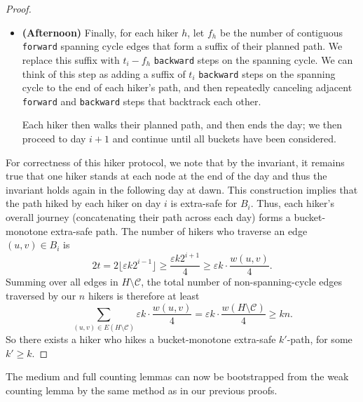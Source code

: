 \documentclass{theoretics}
\newcommand{\eps}{\varepsilon}
\newcommand{\cee}{\mathcal{C}}
\newcommand{\forward}{\texttt{forward}}
\newcommand{\backward}{\texttt{backward}}
\begin{document}
\begin{proof}
\begin{itemize}
\item \textbf{(Afternoon)} Finally, for each hiker $h$, let $f_h$ be the number of contiguous \forward{} spanning cycle edges that form a suffix of their planned path.
We replace this suffix with $t_i-f_h$ \backward{} steps on the spanning cycle.
We can think of this step as adding a suffix of $t_i$ \backward{} steps on the spanning cycle to the end of each hiker's path, and then repeatedly canceling adjacent \forward{} and \backward{} steps that backtrack each other.

Each hiker then walks their planned path, and then ends the day; we then proceed to day $i+1$ and continue until all buckets have been considered.
\end{itemize}

For correctness of this hiker protocol, we note that by the invariant, it remains true that one hiker stands at each node at the end of the day and thus the invariant holds again in the following day at dawn.
This construction implies that the path hiked by each hiker on day $i$ is extra-safe for $B_i$.
Thus, each hiker's overall journey (concatenating their path across each day) forms a bucket-monotone extra-safe path.
The number of hikers who traverse an edge $(u, v) \in B_i$ is
$$2t = 2 \lfloor \eps k 2^{i-1} \rfloor \ge \frac{\eps k 2^{i+1}}{4} \ge \eps k \cdot \frac{w(u, v)}{4}.$$
Summing over all edges in $H \setminus \cee$, the total number of non-spanning-cycle edges traversed by our $n$ hikers is therefore at least
$$\sum \limits_{(u, v) \in E(H \setminus \cee)} \eps k \cdot \frac{w(u, v)}{4} = \eps k \cdot \frac{w(H \setminus \cee)}{4} \ge kn.$$
So there exists a hiker who hikes a bucket-monotone extra-safe $k'$-path, for some $k' \ge k$.
\end{proof}

The medium and full counting lemmas can now be bootstrapped from the weak counting lemma by the same method as in our previous proofs.
\end{document}
